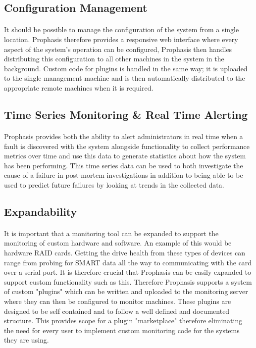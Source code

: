 \documentclass[bsc,logo,twoside]{infthesis}
\begin{document}
\subsection{Configuration Management}
\paragraph*{}
	It should be possible to manage the configuration of the system from a single
	location.  Prophasis therefore provides a responsive web interface where every
	aspect of the system's operation can be configured, Prophasis then handles
	distributing this configuration to all other machines in the system in the
	background. Custom code for plugins is handled in the same way; it is uploaded
	to the single management machine and is then automatically distributed to the
	appropriate remote machines when it is required.
	
\subsection{Time Series Monitoring \& Real Time Alerting}
\paragraph*{}
	Prophasis provides both the ability to alert administrators in real time when
	a fault is discovered with the system alongside functionality to collect
	performance metrics over time and use this data to generate statistics about
	how the system has been performing.  This time series data can be used to both
	investigate the cause of a failure in post-mortem investigations in addition
	to being able to be used to predict future failures by looking at trends in
	the collected data.
	
\subsection{Expandability}
\paragraph*{}
	It is important that a monitoring tool can be expanded to support the
	monitoring of custom hardware and software.  An example of this would be
	hardware RAID cards.  Getting the drive health from these types of devices
	can range from probing for SMART data all the way to communicating with the
	card over a serial port.  It is therefore crucial that Prophasis can be
	easily expanded to support custom functionality such as this. Therefore 
	Prophasis supports a system of custom "plugins" which can be written and
	uploaded to the monitoring server where they can then be configured to monitor
	machines. These plugins are designed to be self contained and to follow a well
	defined and documented structure.  This provides scope for a plugin
	"marketplace" therefore eliminating the need for every user to implement custom
	monitoring code for the systems they are using.
\end{document}
